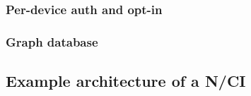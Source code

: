 \subsubsection{Per-device auth and opt-in}
\label{chapter5-user-side-opt-in}

\subsubsection{Graph database}
\label{chapter5-graph-database}


\subsection{Example architecture of a N/CI}
\label{chapter5-example-architecture-of-a-nci}







